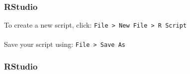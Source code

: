 \documentclass[color=usenames,dvipsnames]{beamer}\usepackage[]{graphicx}\usepackage[]{xcolor}
\begin{document}
\begin{frame}
  \frametitle{RStudio}
  To create a new script, click: {\tt File > New File > R Script} \\
   \\
    Save your script using: {\tt File > Save As}
\end{frame}

\begin{frame}
  \frametitle{RStudio}
\end{frame}
\end{document}
